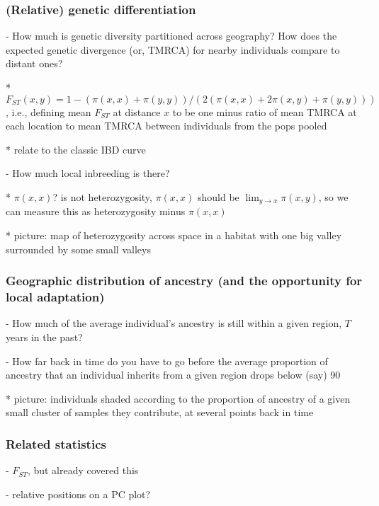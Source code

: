 \documentclass{ar-1col}
\begin{document}
\subsubsection{(Relative) genetic differentiation}

        - How much is genetic diversity partitioned across geography?
            How does the expected genetic divergence (or, TMRCA) for nearby individuals compare to distant ones?
            
            * $F_{ST}(x,y) = 1 - (\pi(x,x) + \pi(y,y))/(2 (\pi(x,x) + 2 \pi(x,y) + \pi(y,y)))$, 
                i.e., defining mean $F_{ST}$ at distance $x$ to be one minus ratio of mean TMRCA at each location
                to mean TMRCA between individuals from the pops pooled

            * relate to the classic IBD curve

        - How much local inbreeding is there?

            * $\pi(x,x)$? is not heterozygosity, $\pi(x,x)$ should be $\lim_{y \to x} \pi(x,y)$,
                so we can measure this as heterozygosity minus $\pi(x,x)$

            * picture: map of heterozygosity across space in a habitat with one big valley surrounded by some small valleys


\subsubsection{Geographic distribution of ancestry (and the opportunity for local adaptation)}

        - How much of the average individual's ancestry is still within a given region, $T$ years in the past?

        - How far back in time do you have to go before the average proportion of ancestry that an individual inherits
            from a given region drops below (say) 90%
            
            * picture: individuals shaded according to the proportion of ancestry of a given small cluster of samples
                they contribute, at several points back in time

\subsubsection{Related statistics}

        - $F_{ST}$, but already covered this

        - relative positions on a PC plot?
\end{document}
